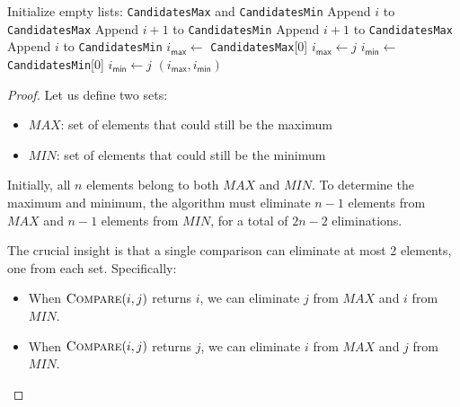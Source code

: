 \documentclass[letterpaper, 11pt]{article}
\newcommand{\1}{\mathds{1}}	%
\theoremstyle{definition}
\newenvironment{solution}{{\par\noindent\it Solution.}}{}
\begin{document}
\begin{solution}
    \begin{algorithm}[H]
        \begin{algorithmic}[1]
            \STATE Initialize empty lists: \texttt{CandidatesMax} and \texttt{CandidatesMin}
                    \STATE Append $i$ to \texttt{CandidatesMax}
                    \STATE Append $i+1$ to \texttt{CandidatesMin}
                \ELSE
                    \STATE Append $i+1$ to \texttt{CandidatesMax}
                    \STATE Append $i$ to \texttt{CandidatesMin}
                \ENDIF
            \ENDFOR
            \STATE $i_\mathsf{max} \gets$ \texttt{CandidatesMax}[0]
                    \STATE $i_\mathsf{max} \gets j$
                \ENDIF
            \ENDFOR
            \STATE $i_\mathsf{min} \gets$ \texttt{CandidatesMin}[0]
                    \STATE $i_\mathsf{min} \gets j$
                \ENDIF
            \ENDFOR
            \ENSURE $(i_\mathsf{max}, i_\mathsf{min})$
        \end{algorithmic}
        \caption{Find the maximum and minimum indices in array $A$ using at most $\frac{3n}{2} - 2$ comparisons}
        \end{algorithm}
        \begin{proof}
            Let us define two sets:
\begin{itemize}
    \item $MAX$: set of elements that could still be the maximum
    \item $MIN$: set of elements that could still be the minimum
\end{itemize}

Initially, all $n$ elements belong to both $MAX$ and $MIN$. To determine the maximum and minimum, the algorithm must eliminate $n-1$ elements from $MAX$ and $n-1$ elements from $MIN$, for a total of $2n-2$ eliminations.

The crucial insight is that a single comparison can eliminate at most 2 elements, one from each set. Specifically:
\begin{itemize}
    \item When $\textsc{Compare}(i,j)$ returns $i$, we can eliminate $j$ from $MAX$ and $i$ from $MIN$.
    \item When $\textsc{Compare}(i,j)$ returns $j$, we can eliminate $i$ from $MAX$ and $j$ from $MIN$.
\end{itemize}


\end{proof}
\end{solution}
\end{document}
